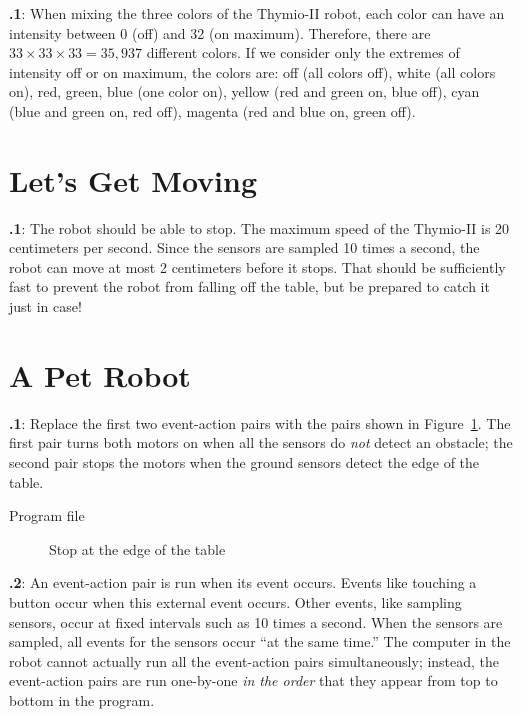 \documentclass[12pt,a4paper,english]{article}
\begin{document}
\textbf{\thesection.1}: 
When mixing the three colors of the Thymio-II robot, each color can have
an intensity between 0 (off) and 32 (on maximum). Therefore, there are
$33 \times 33 \times 33=35,937$ different colors. If we consider only
the extremes of intensity off or on maximum, the colors are: off (all
colors off), white (all colors on), red, green, blue (one color on),
yellow (red and green on, blue off), cyan (blue and green on, red off),
magenta (red and blue on, green off).


\section{Let's Get Moving}

\textbf{\thesection.1}: The robot should be able to stop. The
maximum speed of the Thymio-II is 20 centimeters per second. Since the
sensors are sampled 10 times a second, the robot can move at most 2
centimeters before it stops. That should be sufficiently fast to prevent
the robot from falling off the table, but be prepared to catch it just
in case!


\section{A Pet Robot}

\textbf{\thesection.1}: Replace the first two event-action pairs
with the pairs shown in Figure~\ref{fig.answer1}. The first pair turns
both motors on when all the sensors do \emph{not} detect an obstacle;
the second pair stops the motors when the ground sensors detect the edge
of the table.

{\raggedleft \hfill Program file }

\begin{figure}[hbt]
\begin{center}
\caption{Stop at the edge of the table}\label{fig.answer1}
\end{center}
\end{figure}

\textbf{\thesection.2}: An event-action pair is run when its event
occurs. Events like touching a button occur when this external event
occurs. Other events, like sampling sensors, occur at fixed intervals
such as 10 times a second. When the sensors are sampled, all events for
the sensors occur ``at the same time.'' The computer in the robot cannot
actually run all the event-action pairs simultaneously; instead, the
event-action pairs are run one-by-one \emph{in the order} that they
appear from top to bottom in the program.
\end{document}
